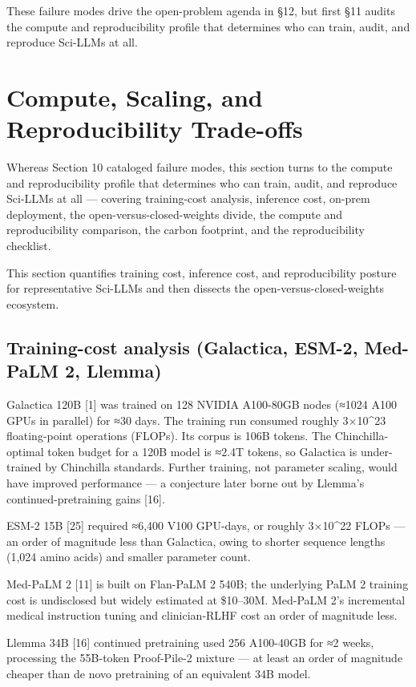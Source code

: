 These failure modes drive the open-problem agenda in §12, but first §11 audits the compute and reproducibility profile that determines who can train, audit, and reproduce Sci-LLMs at all.

\section{Compute, Scaling, and Reproducibility Trade-offs}\label{compute-scaling-and-reproducibility-trade-offs}

Whereas Section 10 cataloged failure modes, this section turns to the compute and reproducibility profile that determines who can train, audit, and reproduce Sci-LLMs at all --- covering training-cost analysis, inference cost, on-prem deployment, the open-versus-closed-weights divide, the compute and reproducibility comparison, the carbon footprint, and the reproducibility checklist.

This section quantifies training cost, inference cost, and reproducibility posture for representative Sci-LLMs and then dissects the open-versus-closed-weights ecosystem.

\subsection{Training-cost analysis (Galactica, ESM-2, Med-PaLM 2, Llemma)}\label{training-cost-analysis-galactica-esm-2-med-palm-2-llemma}

Galactica 120B {[}1{]} was trained on 128 NVIDIA A100-80GB nodes (≈1024 A100 GPUs in parallel) for ≈30 days. The training run consumed roughly 3×10\^{}23 floating-point operations (FLOPs). Its corpus is 106B tokens. The Chinchilla-optimal token budget for a 120B model is ≈2.4T tokens, so Galactica is under-trained by Chinchilla standards. Further training, not parameter scaling, would have improved performance --- a conjecture later borne out by Llemma's continued-pretraining gains {[}16{]}.

ESM-2 15B {[}25{]} required ≈6,400 V100 GPU-days, or roughly 3×10\^{}22 FLOPs --- an order of magnitude less than Galactica, owing to shorter sequence lengths (1,024 amino acids) and smaller parameter count.

Med-PaLM 2 {[}11{]} is built on Flan-PaLM 2 540B; the underlying PaLM 2 training cost is undisclosed but widely estimated at \$10--30M. Med-PaLM 2's incremental medical instruction tuning and clinician-RLHF cost an order of magnitude less.

Llemma 34B {[}16{]} continued pretraining used 256 A100-40GB for ≈2 weeks, processing the 55B-token Proof-Pile-2 mixture --- at least an order of magnitude cheaper than de novo pretraining of an equivalent 34B model.

